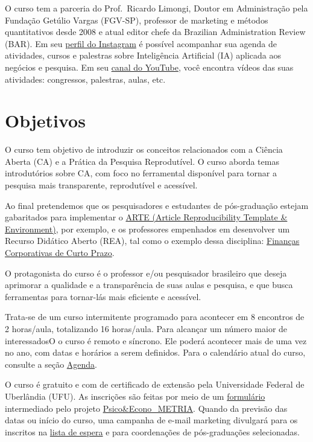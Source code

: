\documentclass[
  a4paper,
]{book}
\begin{document}
O curso tem a parceria do Prof.~Ricardo Limongi, Doutor em Administração
pela Fundação Getúlio Vargas (FGV-SP), professor de marketing e métodos
quantitativos desde 2008 e atual editor chefe da Brazilian
Administration Review (BAR). Em seu
\href{https://www.instagram.com/limongi/}{perfil do Instagram} é
possível acompanhar sua agenda de atividades, cursos e palestras sobre
Inteligência Artificial (IA) aplicada aos negócios e pesquisa. Em seu
\href{https://www.youtube.com/@ricardolimongi_ia}{canal do YouTube},
você encontra vídeos das suas atividades: congressos, palestras, aulas,
etc.

\section*{Objetivos}\label{sec-about}


O curso tem objetivo de introduzir os conceitos relacionados com a
Ciência Aberta (CA) e a Prática da Pesquisa Reprodutível. O curso aborda
temas introdutórios sobre CA, com foco no ferramental disponível para
tornar a pesquisa mais transparente, reprodutível e acessível.

Ao final pretendemos que os pesquisadores e estudantes de pós-graduação
estejam gabaritados para implementar o
\href{https://phdpablo.github.io/article-template/}{ARTE (Article
Reproducibility Template \& Environment)}, por exemplo, e os professores
empenhados em desenvolver um Recurso Didático Aberto (REA), tal como o
exemplo dessa disciplina: \href{https://fccp.phdpablo.com/}{Finanças
Corporativas de Curto Prazo}.

O protagonista do curso é o professor e/ou pesquisador brasileiro que
deseja aprimorar a qualidade e a transparência de suas aulas e pesquisa,
e que busca ferramentas para tornar-lás mais eficiente e acessível.

Trata-se de um curso intermitente programado para acontecer em 8
encontros de 2 horas/aula, totalizando 16 horas/aula. Para alcançar um
número maior de interessadosO o curso é remoto e síncrono. Ele poderá
acontecer mais de uma vez no ano, com datas e horários a serem
definidos. Para o calendário atual do curso, consulte a seção
\href{00-schedule.html}{Agenda}.

O curso é gratuito e com de certificado de extensão pela Universidade
Federal de Uberlândia (UFU). As inscrições são feitas por meio de um
\href{https://forms.gle/wRNWAU9Ffyp7o4Vq9}{formulário} intermediado pelo
projeto
\href{https://www.youtube.com/c/PsicoEconoMETRIA}{Psico\&Econo\_METRIA}.
Quando da previsão das datas ou início do curso, uma campanha de e-mail
marketing divulgará para os inscritos na
\href{https://forms.gle/wRNWAU9Ffyp7o4Vq9}{lista de espera} e para
coordenações de pós-graduações selecionadas.
\end{document}
